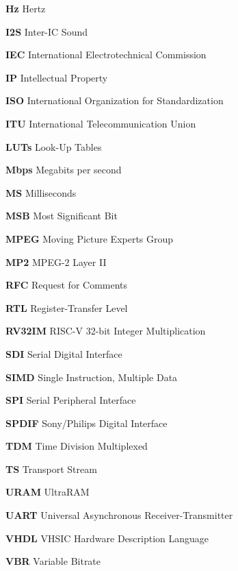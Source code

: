 \begin{description}
    \item \textbf{Hz} Hertz
    \item \textbf{I2S} Inter-IC Sound
    \item \textbf{IEC} International Electrotechnical Commission
    \item \textbf{IP} Intellectual Property
    \item \textbf{ISO} International Organization for Standardization
    \item \textbf{ITU} International Telecommunication Union
    \item \textbf{LUTs} Look-Up Tables
    \item \textbf{Mbps} Megabits per second
    \item \textbf{MS} Milliseconds
    \item \textbf{MSB} Most Significant Bit
    \item \textbf{MPEG} Moving Picture Experts Group
    \item \textbf{MP2} MPEG-2 Layer II
    \item \textbf{RFC} Request for Comments
    \item \textbf{RTL} Register-Transfer Level
    \item \textbf{RV32IM} RISC-V 32-bit Integer Multiplication
    \item \textbf{SDI} Serial Digital Interface
    \item \textbf{SIMD} Single Instruction, Multiple Data
    \item \textbf{SPI} Serial Peripheral Interface
    \item \textbf{SPDIF} Sony/Philips Digital Interface
    \item \textbf{TDM} Time Division Multiplexed
    \item \textbf{TS} Transport Stream
    \item \textbf{URAM} UltraRAM
    \item \textbf{UART} Universal Asynchronous Receiver-Transmitter
    \item \textbf{VHDL} VHSIC Hardware Description Language
    \item \textbf{VBR} Variable Bitrate
\end{description}